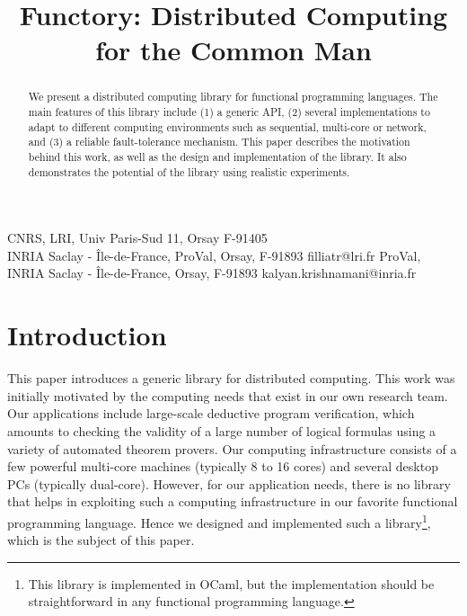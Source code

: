 \documentclass[preprint]{sigplanconf}
\newcommand{\Ocaml}{OCaml}
\begin{document}
\copyrightdata{[to be supplied]} 


\title{Functory: Distributed Computing for the Common Man}

           {CNRS, LRI, Univ Paris-Sud 11, Orsay F-91405\\
            INRIA Saclay - \^{I}le-de-France, ProVal, Orsay, F-91893}
           {filliatr@lri.fr}
           {ProVal, INRIA Saclay - \^{I}le-de-France, Orsay, F-91893}
           {kalyan.krishnamani@inria.fr}

\maketitle

\begin{abstract}
  We present a distributed computing library for
  functional programming languages. The main features of this library
  include (1) a generic API, (2) several implementations to
  adapt to different computing environments such as sequential,
  multi-core or network, and (3) a reliable fault-tolerance mechanism.
  This paper describes the motivation behind this work, as well as
  the design and implementation of the library. It also demonstrates
  the potential of the library using realistic experiments.
\end{abstract}




\section{Introduction}

This paper introduces a generic library for distributed computing. This
work was initially motivated by the computing needs that exist in our
own research team. Our applications include large-scale deductive
program verification, which amounts to checking the validity of a
large number of logical formulas using a variety of automated theorem
provers. Our computing infrastructure consists
of a few powerful multi-core machines (typically 8 to 16 cores) and
several desktop PCs (typically dual-core). However, for our
application needs, there is no library that helps in exploiting such a
computing infrastructure in our favorite functional programming
language.  Hence we designed and implemented such a
library\footnote{This library is implemented in \Ocaml, but the
  implementation should be straightforward in any functional
  programming language.}, which is the subject of this paper.
\end{document}

